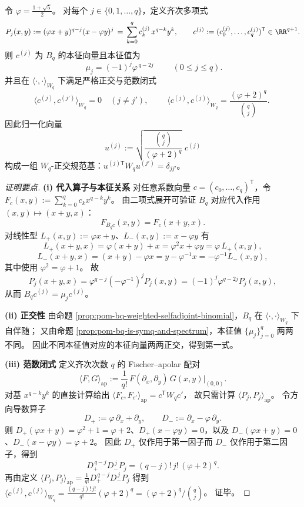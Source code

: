 \begin{conclusion}\label{con:xi-bq-golden-spectrum-orthogonality-norm}
令 \(\varphi=\frac{1+\sqrt5}{2}\)。
对每个 \(j\in\{0,1,\dots,q\}\)，定义齐次多项式
\[
P_j(x,y):=(\varphi x+y)^{q-j}(x-\varphi y)^{j}
\,=\,\sum_{k=0}^{q}c^{(j)}_k\,x^{q-k}y^{k},
\qquad
c^{(j)}:=(c^{(j)}_0,\dots,c^{(j)}_q)^{\mathsf T}\in\RR^{q+1}.
\]
则 \(c^{(j)}\) 为 \(B_q\) 的本征向量且本征值为
\[
\boxed{\;\mu_j=(-1)^j\varphi^{\,q-2j}\;}
\qquad(0\le j\le q).
\]
并且在 \(\langle\cdot,\cdot\rangle_{W_q}\) 下满足严格正交与范数闭式
\[
\langle c^{(j)},c^{(j')}\rangle_{W_q}=0\quad(j\neq j'),
\qquad
\boxed{\;\langle c^{(j)},c^{(j)}\rangle_{W_q}=\frac{(\varphi+2)^{q}}{\binom{q}{j}}.\;}
\]
因此归一化向量
\[
u^{(j)}:=\sqrt{\frac{\binom{q}{j}}{(\varphi+2)^q}}\;c^{(j)}
\]
构成一组 \(W_q\)-正交规范基：\(u^{(j)\mathsf T}W_qu^{(j')}=\delta_{jj'}\)。
\end{conclusion}
\begin{proof}[证明要点]
\par\noindent\textbf{(i) 代入算子与本征关系}
对任意系数向量 \(c=(c_0,\dots,c_q)^{\mathsf T}\)，令 \(F_c(x,y):=\sum_{k=0}^{q}c_kx^{q-k}y^k\)。
由二项式展开可验证 \(B_q\) 对应代入作用 \((x,y)\mapsto(x+y,x)\)：
\[
F_{B_qc}(x,y)=F_c(x+y,x).
\]
对线性型 \(L_+(x,y):=\varphi x+y\)、\(L_-(x,y):=x-\varphi y\) 有
\[
L_+(x+y,x)=\varphi(x+y)+x=\varphi^2x+\varphi y=\varphi\,L_+(x,y),
\]
\[
L_-(x+y,x)=(x+y)-\varphi x=y-\varphi^{-1}x=-\varphi^{-1}L_-(x,y),
\]
其中使用 \(\varphi^2=\varphi+1\)。
故
\[
P_j(x+y,x)=\varphi^{q-j}(-\varphi^{-1})^{j}P_j(x,y)=(-1)^j\varphi^{q-2j}P_j(x,y),
\]
从而 \(B_qc^{(j)}=\mu_jc^{(j)}\)。

\par\noindent\textbf{(ii) 正交性}
由命题 \ref{prop:pom-bq-weighted-selfadjoint-binomial}，\(B_q\) 在 \(\langle\cdot,\cdot\rangle_{W_q}\) 下自伴随；
又由命题 \ref{prop:pom-bq-is-symq-and-spectrum}，本征值 \(\{\mu_j\}_{j=0}^{q}\) 两两不同。
因此不同本征值对应的本征向量两两正交，得到第一式。

\par\noindent\textbf{(iii) 范数闭式}
定义齐次次数 \(q\) 的 Fischer--apolar 配对
\[
\langle F,G\rangle_{\mathrm{ap}}
:=\frac{1}{q!}\,F(\partial_x,\partial_y)\,G(x,y)\big|_{(0,0)}.
\]
对基 \(x^{q-k}y^k\) 的直接计算给出
\(
\langle F_c,F_{c'}\rangle_{\mathrm{ap}}=c^{\mathsf T}W_qc'
\)，
故只需计算 \(\langle P_j,P_j\rangle_{\mathrm{ap}}\)。
令方向导数算子
\[
D_+:=\varphi\,\partial_x+\partial_y,\qquad D_-:=\partial_x-\varphi\,\partial_y.
\]
则 \(D_+(\varphi x+y)=\varphi^2+1=\varphi+2\)、\(D_+(x-\varphi y)=0\)，以及 \(D_-(\varphi x+y)=0\)、\(D_-(x-\varphi y)=\varphi+2\)。
因此 \(D_+\) 仅作用于第一因子而 \(D_-\) 仅作用于第二因子，得到
\[
D_+^{\,q-j}D_-^{\,j}P_j
=(q-j)!\,j!\,(\varphi+2)^{q}.
\]
再由定义
\(
\langle P_j,P_j\rangle_{\mathrm{ap}}
=\frac{1}{q!}D_+^{\,q-j}D_-^{\,j}P_j
\)
得到
\(
\langle c^{(j)},c^{(j)}\rangle_{W_q}
=\frac{(q-j)!\,j!}{q!}(\varphi+2)^q=(\varphi+2)^q/\binom{q}{j}
\)。
证毕。
\end{proof}

